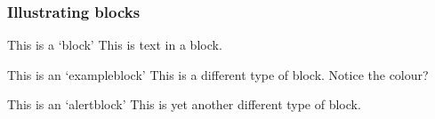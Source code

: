 \documentclass[aspectratio=169]{beamer} %
\begin{document}
\begin{frame}[c]
	\frametitle{Illustrating blocks}

	\begin{block}{This is a `block'}
		This is text in a block.
	\end{block}

	\begin{exampleblock}{This is an `exampleblock'}
		This is a different type of block. Notice the colour?
	\end{exampleblock}
	
	\begin{alertblock}{This is an `alertblock'}
		This is yet another different type of block. 
	\end{alertblock}
	
\end{frame}
\end{document}

